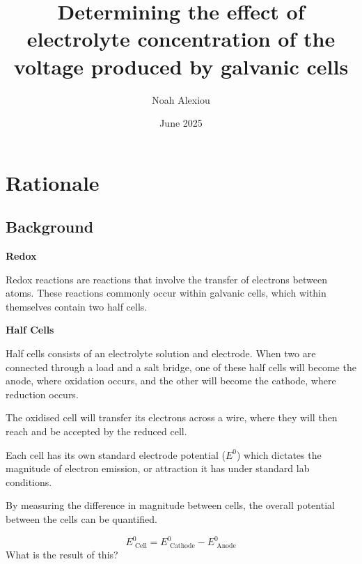 \documentclass[11pt,a4paper]{article}
\begin{document}
	\nocite{*}
	
	\begin{titlepage}
		
		
		\title{Determining the effect of electrolyte concentration of the voltage produced by galvanic cells}
		
		\author{Noah Alexiou}
		
		
		\date{June 2025}
		
		\maketitle
		\centering
		
	\end{titlepage}
	\tableofcontents
	\newpage
	
	
	\section{Rationale}
	
	
	\subsection{Background}

	

	\textbf{Redox}
	
	Redox reactions are reactions that involve the transfer of electrons between atoms. These reactions commonly occur within galvanic cells, which within themselves contain two half cells. 
	

	\textbf{Half Cells}
	
	Half cells consists of an electrolyte solution and electrode. When two are connected through a load and a salt  bridge, one of these half cells will become the anode, where oxidation occurs, and the other will become the cathode, where reduction occurs.
	
	The oxidised cell will transfer its electrons across a wire, where they will then reach and be accepted by the reduced cell.
	
	Each cell has its own standard electrode potential ($E^0$) which dictates the magnitude of electron emission, or attraction it has under standard lab conditions. 
	
	By measuring the difference in magnitude between cells, the overall potential between the cells can be quantified. 
	
	$$
	E^0_{\textrm{ Cell}}=E^0_{\textrm{ Cathode}}-E^0_{\textrm{ Anode}}
	$$
	What is the result of this?
	
\end{document}
